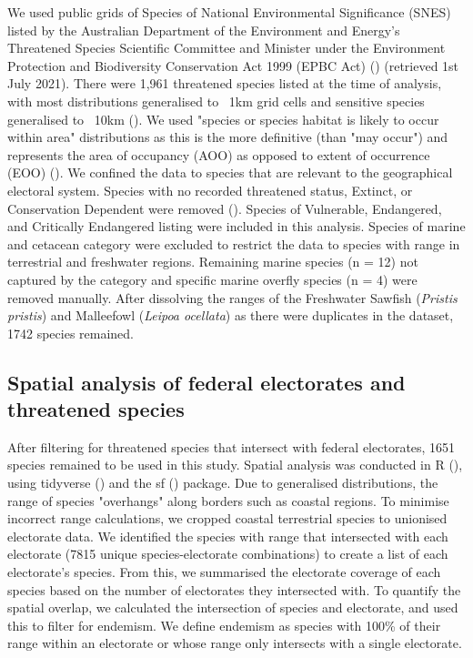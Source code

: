 \documentclass[a4paper,11pt]{article}
\begin{document}
We used public grids of Species of National Environmental Significance (SNES) listed by the Australian Department of the Environment and Energy’s Threatened Species Scientific Committee and Minister under the Environment Protection and Biodiversity Conservation Act 1999 (EPBC Act) (\cite{commonwealthofaustraliaThreatenedSpeciesEPBC2021}) (retrieved 1st July 2021). There were 1,961 threatened species listed at the time of analysis, with most distributions generalised to ~1km grid cells and sensitive species generalised to ~10km (\cite{commonwealthofaustraliaThreatenedSpeciesEPBC2021}). We used "species or species habitat is likely to occur within area" distributions as this is the more definitive (than "may occur") and represents the area of occupancy (AOO) as opposed to extent of occurrence (EOO) (\cite{gastonSizesSpeciesGeographic2009, lloydEstimatingSpatialCoverage2020}). We confined the data to species that are relevant to the geographical electoral system. Species with no recorded threatened status, Extinct, or Conservation Dependent were removed (\cite{wardNationalscaleDatasetThreats}). Species of Vulnerable, Endangered, and Critically Endangered listing were included in this analysis. Species of marine and cetacean category were excluded to restrict the data to species with range in terrestrial and freshwater regions. Remaining marine species (n = 12) not captured by the category and specific marine overfly species (n = 4) were removed manually. After dissolving the ranges of the Freshwater Sawfish (\emph{Pristis pristis}) and Malleefowl (\emph{Leipoa ocellata}) as there were duplicates in the dataset, 1742 species remained.

\subsection{Spatial analysis of federal electorates and threatened species}

After filtering for threatened species that intersect with federal electorates, 1651 species remained to be used in this study. Spatial analysis was conducted in R (\cite{rcoreteamLanguageEnvironmentStatistical2021}), using tidyverse (\cite{wickhamWelcomeTidyverse2019}) and the sf (\cite{pebesmaSimpleFeaturesStandardized2018}) package. Due to generalised distributions, the range of species "overhangs" along borders such as coastal regions. To minimise incorrect range calculations, we cropped coastal terrestrial species to unionised electorate data. We identified the species with range that intersected with each electorate (7815 unique species-electorate combinations) to create a list of each electorate's species. From this, we summarised the electorate coverage of each species based on the number of electorates they intersected with. To quantify the spatial overlap, we calculated the intersection of species and electorate, and used this to filter for endemism. We define endemism as species with 100\% of their range within an electorate or whose range only intersects with a single electorate.
\end{document}
